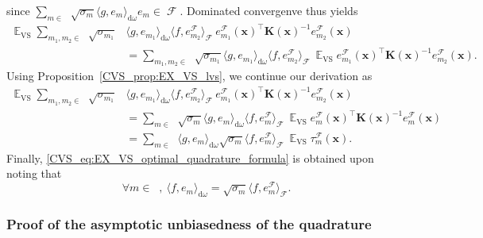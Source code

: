 \documentclass[twoside,11pt]{book}
\numberwithin{theorem}{chapter}
\numberwithin{definition}{chapter}
\numberwithin{proposition}{chapter}
\numberwithin{corollary}{chapter}
\numberwithin{example}{chapter}
\numberwithin{lemma}{chapter}
\numberwithin{assumption}{chapter}
\numberwithin{equation}{chapter}
\numberwithin{figure}{chapter}
\DeclareMathOperator{\VS}{\mathrm{VS}}
\DeclareMathOperator{\Tran}{\intercal}
\DeclareMathOperator{\EX}{\mathbb{E}}
\DeclareMathOperator{\F}{\mathcal{F}}
\DeclareMathOperator{\Ns}{\mathbb{N}^{*}}
\begin{document}
since $\sum_{m \in \Ns} \sqrt{\sigma_{m}}\langle g,e_{m} \rangle_{\mathrm{d}\omega} e_{m} \in \F$.
Dominated convergenve thus yields
\begin{align}
\EX_{\VS} \sum\limits_{m_{1},m_{2} \in \Ns} \sqrt{\sigma_{m_{1}}} & \langle g, e_{m_{1}} \rangle_{\mathrm{d}\omega}  \langle f, e_{m_{2}}^{\F} \rangle_{\F} \:e_{m_{1}}^{\F}(\bm{x})^{\Tran} \bm{K}(\bm{x})^{-1}e_{m_{2}}^{\F}(\bm{x}) \\
& = \sum\limits_{m_{1},m_{2} \in \Ns} \sqrt{\sigma_{m_{1}}} \langle g, e_{m_{1}} \rangle_{\mathrm{d}\omega}  \langle f, e_{m_{2}}^{\F} \rangle_{\F} \:\EX_{\VS} e_{m_{1}}^{\F}(\bm{x})^{\Tran} \bm{K}(\bm{x})^{-1}e_{m_{2}}^{\F}(\bm{x}).
\end{align}
Using Proposition~\ref{CVS_prop:EX_VS_lvs}, we continue our derivation as
\begin{align}
\EX_{\VS} \sum\limits_{m_{1},m_{2} \in \Ns} \sqrt{\sigma_{m_{1}}} & \langle g, e_{m_{1}} \rangle_{\mathrm{d}\omega}  \langle f, e_{m_{2}}^{\F} \rangle_{\F} \: e_{m_{1}}^{\F}(\bm{x})^{\Tran} \bm{K}(\bm{x})^{-1}e_{m_{2}}^{\F}(\bm{x}) \\
& = \sum\limits_{m \in \Ns} \sqrt{\sigma_{m}} \langle g, e_{m} \rangle_{\mathrm{d}\omega}  \langle f, e_{m}^{\F} \rangle_{\F} \: \EX_{\VS} e_{m}^{\F}(\bm{x})^{\Tran} \bm{K}(\bm{x})^{-1}e_{m}^{\F}(\bm{x})\\
& = \sum\limits_{m \in \Ns}  \langle g, e_{m} \rangle_{\mathrm{d}\omega}  \sqrt{\sigma_{m}}\langle f, e_{m}^{\F} \rangle_{\F} \: \EX_{\VS} \tau_{m}^{\F}(\bm{x}).
\end{align}
Finally, \eqref{CVS_eq:EX_VS_optimal_quadrature_formula} is obtained upon noting that
\begin{equation}
\forall m \in \Ns, \: \langle f,e_{m} \rangle_{\mathrm{d}\omega} = \sqrt{\sigma_{m}} \langle f,e_{m}^{\F} \rangle_{\F}.
\end{equation}
\subsubsection{Proof of the asymptotic unbiasedness of the quadrature }
\end{document}

